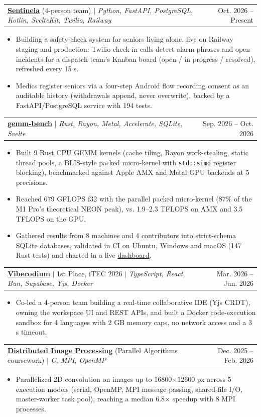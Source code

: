 \documentclass[a4paper, 10pt]{article}
\makeatletter
\newcommand{\resumeItem}[1]{ \item\small{ {#1 \vspace{-2pt}} } }
\newcommand{\resumeProjectHeading}[2]{ \item
\begin{tabular*}{0.97\textwidth}{l@{\extracolsep{\fill}}r}
	\small#1 & #2 \\
\end{tabular*}
\vspace{-2pt}
}
\newcommand{\resumeItemListStart}{\begin{itemize}}
\newcommand{\resumeItemListEnd}{\end{itemize}
\vspace{-2pt}}
\makeatother
\begin{document}
	\resumeProjectHeading
	{\textbf{\href{https://github.com/paulhondola/Sentinela-Test}{\underline{Sentinela}}} (4-person team) $|$ \emph{Python, FastAPI, PostgreSQL, Kotlin, SvelteKit, Twilio, Railway}}{Oct. 2026 -- Present}
	\resumeItemListStart
		\resumeItem{Building a safety-check system for seniors living alone, live on Railway staging and production: Twilio check-in calls detect alarm phrases and open incidents for a dispatch team's Kanban board (open / in progress / resolved), refreshed every 15 s.}
		\resumeItem{Medics register seniors via a four-step Android flow recording consent as an auditable history (withdrawals append, never overwrite), backed by a FastAPI/PostgreSQL service with 194 tests.}
	\resumeItemListEnd

	\resumeProjectHeading
	{\textbf{\href{https://github.com/paulhondola/gemm-bench}{\underline{gemm-bench}}} $|$ \emph{Rust, Rayon, Metal, Accelerate, SQLite, Svelte}}{Sep. 2026 -- Oct. 2026}
	\resumeItemListStart
		\resumeItem{Built 9 Rust CPU GEMM kernels (cache tiling, Rayon work-stealing, static thread pools, a BLIS-style packed micro-kernel with \texttt{std::simd} register blocking), benchmarked against Apple AMX and Metal GPU backends at 5 precisions.}
		\resumeItem{Reached 679 GFLOPS f32 with the parallel packed micro-kernel (87\% of the M1 Pro's theoretical NEON peak), vs. 1.9--2.3 TFLOPS on AMX and 3.5 TFLOPS on the GPU.}
		\resumeItem{Gathered results from 8 machines and 4 contributors into strict-schema SQLite databases, validated in CI on Ubuntu, Windows and macOS (147 Rust tests) and charted in a live \href{https://paulhondola.github.io/gemm-bench/}{\underline{dashboard}}.}
	\resumeItemListEnd

	\resumeProjectHeading
	{\textbf{\href{https://github.com/paulhondola/vibecodium}{\underline{Vibecodium}}} $|$ 1st Place, iTEC 2026 $|$ \emph{TypeScript, React, Bun, Supabase, Yjs, Docker}}{Mar. 2026 -- Jun. 2026}
	\resumeItemListStart
		\resumeItem{Co-led a 4-person team building a real-time collaborative IDE (Yjs CRDT), owning the workspace UI and REST APIs, and built a Docker code-execution sandbox for 4 languages with 2 GB memory caps, no network access and a 3 s timeout.}
	\resumeItemListEnd

	\resumeProjectHeading
	{\textbf{\href{https://github.com/paulhondola/MPI-OpenMP-Image-Processing}{\underline{Distributed Image Processing}}} (Parallel Algorithms coursework) $|$ \emph{C, MPI, OpenMP}}{Dec. 2025 -- Feb. 2026}
	\resumeItemListStart
		\resumeItem{Parallelized 2D convolution on images up to 16800$\times$12600 px across 5 execution models (serial, OpenMP, MPI message passing, shared-file I/O, master-worker task pool), reaching a median 6.8$\times$ speedup with 8 MPI processes.}
	\resumeItemListEnd
\end{document}
